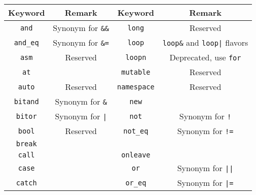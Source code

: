 \renewcommand{\baselinestretch}{.85}
\begin{table}[\floatpos]
  \centering
  \begin{tabular}{|c|c||c|c|}
    \hline
    Keyword                       & Remark                           &
    Keyword                       & Remark                           \\
    \hline
    \lstinline"and"               & Synonym for \lstinline|&&|       &
    \lstinline"long"              & Reserved                         \\
    \lstinline"and_eq"            & Synonym for \lstinline|&=|       &
    \lstinline"loop"              & \lstinline|loop&| and
                                    \lstinline-loop|- flavors        \\
    \lstinline"asm"               & Reserved                         &
    \lstinline"loopn"             & Deprecated, use \lstinline|for|  \\
    \lstinline"at"                &                                  &
    \lstinline"mutable"           & Reserved                         \\
    \lstinline"auto"              & Reserved                         &
    \lstinline"namespace"         & Reserved                         \\
    \lstinline"bitand"            & Synonym for \lstinline|&|        &
    \lstinline"new"               &                                  \\
    \lstinline"bitor"             & Synonym for \lstinline-|-        &
    \lstinline"not"               & Synonym for \lstinline|!|        \\
    \lstinline"bool"              & Reserved                         &
    \lstinline"not_eq"            & Synonym for \lstinline|!=|       \\
    \lstinline"break"             &                                  &
                                  &                                  \\
    \lstinline"call"              &                                  &
    \lstinline"onleave"           &                                  \\
    \lstinline"case"              &                                  &
    \lstinline"or"                & Synonym for \lstinline-||-       \\
    \lstinline"catch"             &                                  &
    \lstinline"or_eq"             & Synonym for \lstinline-|=-       \\

\end{tabular}
\end{table}
